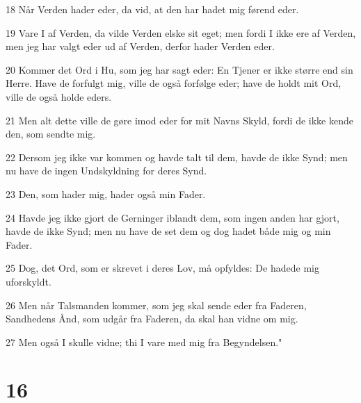 \par 18 Når Verden hader eder, da vid, at den har hadet mig førend eder.
\par 19 Vare I af Verden, da vilde Verden elske sit eget; men fordi I ikke ere af Verden, men jeg har valgt eder ud af Verden, derfor hader Verden eder.
\par 20 Kommer det Ord i Hu, som jeg har sagt eder: En Tjener er ikke større end sin Herre. Have de forfulgt mig, ville de også forfølge eder; have de holdt mit Ord, ville de også holde eders.
\par 21 Men alt dette ville de gøre imod eder for mit Navns Skyld, fordi de ikke kende den, som sendte mig.
\par 22 Dersom jeg ikke var kommen og havde talt til dem, havde de ikke Synd; men nu have de ingen Undskyldning for deres Synd.
\par 23 Den, som hader mig, hader også min Fader.
\par 24 Havde jeg ikke gjort de Gerninger iblandt dem, som ingen anden har gjort, havde de ikke Synd; men nu have de set dem og dog hadet både mig og min Fader.
\par 25 Dog, det Ord, som er skrevet i deres Lov, må opfyldes: De hadede mig uforskyldt.
\par 26 Men når Talsmanden kommer, som jeg skal sende eder fra Faderen, Sandhedens Ånd, som udgår fra Faderen, da skal han vidne om mig.
\par 27 Men også I skulle vidne; thi I vare med mig fra Begyndelsen."

\chapter{16}

